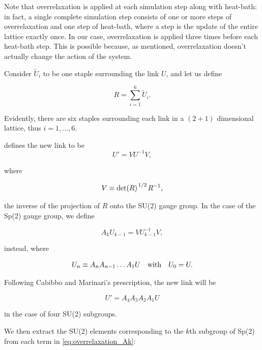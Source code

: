 \documentclass[reqno,12pt]{article}
\numberwithin{equation}{section}
\begin{document}
Note that overrelaxation is applied at each simulation step along with heat-bath: in fact,
a single complete simulation step consists of one or more steps of overrelaxation and one step of heat-bath, where
a step is the update of the entire lattice exactly once. In our case, overrelaxation is applied three times
before each heat-bath step. This is possible because, as mentioned, overrelaxation doesn't actually change
the action of the system.

Consider $\widetilde{U}_i$ to be one staple surrounding the link $U$, and let us define

\begin{equation}
	R = \sum_{i = 1}^6 \widetilde{U}_i.
\end{equation}

Evidently, there are six staples surrounding each link in a $(2+1)$ dimensional lattice, thus $i = 1,\dots,6$.

\cite{montvay} defines the new link to be
\begin{equation}
	U' = V U^{-1} V,
\end{equation}

where 

\begin{equation}
	V \equiv \det(R)^{\flatfrac{1}{2}} R^{-1},
\end{equation}

the inverse of the projection of $R$ onto the SU(2) gauge group. In the case of the Sp(2) gauge group, 
we define 

\begin{equation} \label{eq:overrelaxation_Ak}
	A_k U_{k-1} = V U_{k-1}^{-1} V,
\end{equation}

instead, where 

\begin{equation}
	U_{n} \equiv A_n A_{n-1} \dots A_1 U \qq{with} U_0 = U.
\end{equation}

Following Cabibbo and Marinari's prescription, the new link will be

\begin{equation} \label{eq:overrelaxation_newlink}
	U' = A_4 A_3 A_2 A_1 U
\end{equation}

in the case of four SU(2) subgroups.

We then extract the SU(2) elements corresponding to the $k$th subgroup of Sp(2) 
from each term in \eqref{eq:overrelaxation_Ak}:
\end{document}
